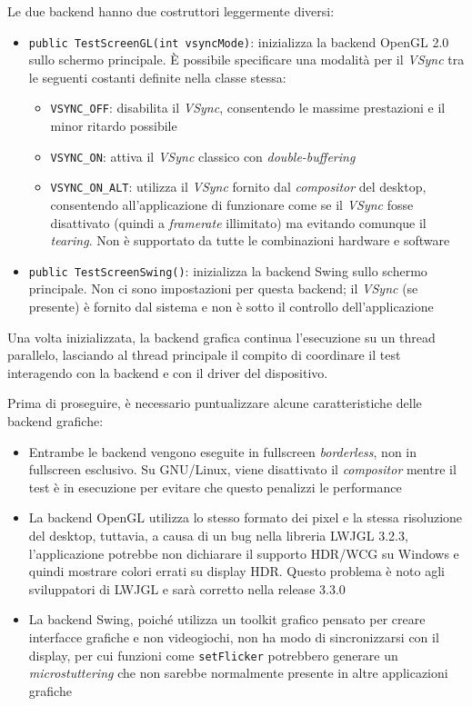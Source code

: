 Le due backend hanno due costruttori leggermente diversi:
\begin{itemize}
	\item \texttt{public TestScreenGL(int vsyncMode)}: inizializza la backend OpenGL 2.0 sullo schermo principale. È possibile specificare una modalità per il \textit{VSync} tra le seguenti costanti definite nella classe stessa:
	\begin{itemize}
		\item \texttt{VSYNC\_OFF}: disabilita il \textit{VSync}, consentendo le massime prestazioni e il minor ritardo possibile
		\item \texttt{VSYNC\_ON}: attiva il \textit{VSync} classico con \textit{double-buffering}
		\item \texttt{VSYNC\_ON\_ALT}: utilizza il \textit{VSync} fornito dal \textit{compositor} del desktop, consentendo all'applicazione di funzionare come se il \textit{VSync} fosse disattivato (quindi a \textit{framerate} illimitato) ma evitando comunque il \textit{tearing}. Non è supportato da tutte le combinazioni hardware e software
	\end{itemize}
	\item \texttt{public TestScreenSwing()}: inizializza la backend Swing sullo schermo principale. Non ci sono impostazioni per questa backend; il \textit{VSync} (se presente) è fornito dal sistema e non è sotto il controllo dell'applicazione
\end{itemize}

Una volta inizializzata, la backend grafica continua l'esecuzione su un thread parallelo, lasciando al thread principale il compito di coordinare il test interagendo con la backend e con il driver del dispositivo.

Prima di proseguire, è necessario puntualizzare alcune caratteristiche delle backend grafiche:\begin{itemize}
	\item Entrambe le backend vengono eseguite in fullscreen \textit{borderless}, non in fullscreen esclusivo. Su GNU/Linux, viene disattivato il \textit{compositor} mentre il test è in esecuzione per evitare che questo penalizzi le performance
	\item La backend OpenGL utilizza lo stesso formato dei pixel e la stessa risoluzione del desktop, tuttavia, a causa di un bug nella libreria LWJGL 3.2.3, l'applicazione potrebbe non dichiarare il supporto HDR/WCG su Windows e quindi mostrare colori errati su display HDR. Questo problema è noto agli sviluppatori di LWJGL e sarà corretto nella release 3.3.0
	\item La backend Swing, poiché utilizza un toolkit grafico pensato per creare interfacce grafiche e non videogiochi, non ha modo di sincronizzarsi con il display, per cui funzioni come \texttt{setFlicker} potrebbero generare un \textit{microstuttering} che non sarebbe normalmente presente in altre applicazioni grafiche
\end{itemize}

